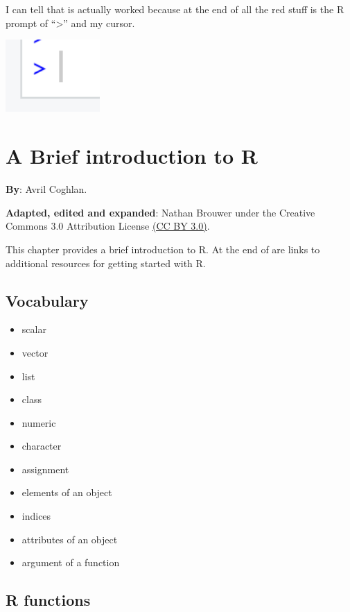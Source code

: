 \documentclass[
]{book}
\providecommand{\tightlist}{%
  \setlength{\itemsep}{0pt}\setlength{\parskip}{0pt}}
\begin{document}
I can tell that is actually worked because at the end of all the red stuff is the R prompt of ``\textgreater{}'' and my cursor.

\includegraphics[width=1.42in]{images/R_cursor}

\hypertarget{a-brief-introduction-to-r}{%
\chapter{A Brief introduction to R}\label{a-brief-introduction-to-r}}

\textbf{By}: Avril Coghlan.

\textbf{Adapted, edited and expanded}: Nathan Brouwer under the Creative Commons 3.0 Attribution License \href{https://creativecommons.org/licenses/by/3.0/}{(CC BY 3.0)}.

This chapter provides a brief introduction to R. At the end of are links to additional resources for getting started with R.

\hypertarget{vocabulary}{%
\section{Vocabulary}\label{vocabulary}}

\begin{itemize}
\tightlist
\item
  scalar
\item
  vector
\item
  list
\item
  class
\item
  numeric
\item
  character
\item
  assignment
\item
  elements of an object
\item
  indices
\item
  attributes of an object
\item
  argument of a function
\end{itemize}

\hypertarget{r-functions}{%
\section{R functions}\label{r-functions}}
\end{document}
